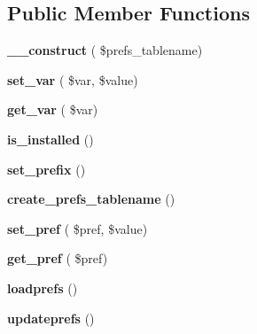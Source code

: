 \subsection*{Public Member Functions}
\begin{DoxyCompactItemize}
\item 
\hypertarget{classdb__base_a82d94b2aea7891f45456443e67464edc}{}\label{classdb__base_a82d94b2aea7891f45456443e67464edc} 
{\bfseries \+\_\+\+\_\+construct} ( \$prefs\+\_\+tablename)
\item 
\hypertarget{classdb__base_a2ed852964c0560b3caf8557be2fddf50}{}\label{classdb__base_a2ed852964c0560b3caf8557be2fddf50} 
{\bfseries set\+\_\+var} ( \$var, \$value)
\item 
\hypertarget{classdb__base_ad94bd4f63c41dabc42a3d3be0e8e3f39}{}\label{classdb__base_ad94bd4f63c41dabc42a3d3be0e8e3f39} 
{\bfseries get\+\_\+var} ( \$var)
\item 
\hypertarget{classdb__base_a6bd7e3cea0f3a2b0537561f6198b3e0c}{}\label{classdb__base_a6bd7e3cea0f3a2b0537561f6198b3e0c} 
{\bfseries is\+\_\+installed} ()
\item 
\hypertarget{classdb__base_a0b2658043bfa8d8b8622a13c4b24c5ef}{}\label{classdb__base_a0b2658043bfa8d8b8622a13c4b24c5ef} 
{\bfseries set\+\_\+prefix} ()
\item 
\hypertarget{classdb__base_a26ccf2dca3eabeaadf9a71d60d82de7a}{}\label{classdb__base_a26ccf2dca3eabeaadf9a71d60d82de7a} 
{\bfseries create\+\_\+prefs\+\_\+tablename} ()
\item 
\hypertarget{classdb__base_acceef2bae1e88ea15b8eb4eed8c733fe}{}\label{classdb__base_acceef2bae1e88ea15b8eb4eed8c733fe} 
{\bfseries set\+\_\+pref} ( \$pref, \$value)
\item 
\hypertarget{classdb__base_a5137601f0becff0d60dfff251e4676a2}{}\label{classdb__base_a5137601f0becff0d60dfff251e4676a2} 
{\bfseries get\+\_\+pref} ( \$pref)
\item 
\hypertarget{classdb__base_acea126dae62bc77cf51a6a9dda56461e}{}\label{classdb__base_acea126dae62bc77cf51a6a9dda56461e} 
{\bfseries loadprefs} ()
\item 
\hypertarget{classdb__base_ada839b0fb3deecf085b808c9dcedbceb}{}\label{classdb__base_ada839b0fb3deecf085b808c9dcedbceb} 
{\bfseries updateprefs} ()
\end{DoxyCompactItemize}
